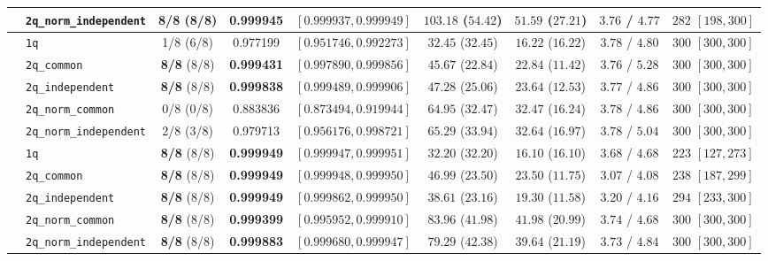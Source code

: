 \documentclass[11pt,a4paper]{article}
\begin{document}
\begin{table}[H]
{\begin{tabular}{llccccccc}
 & \texttt{2q\_norm\_independent} & \textbf{8/8} (8/8) & \textbf{0.999945} & $[0.999937, 0.999949]$ & $103.18$ ($54.42$) & $51.59$ ($27.21$) & $3.76$ / $4.77$ & $282$ $[198, 300]$ \\
\midrule
{}
 & \texttt{1q} & 1/8 (6/8) & 0.977199 & $[0.951746, 0.992273]$ & $32.45$ ($32.45$) & $16.22$ ($16.22$) & $3.78$ / $4.80$ & $300$ $[300, 300]$ \\
 & \texttt{2q\_common} & \textbf{8/8} (8/8) & \textbf{0.999431} & $[0.997890, 0.999856]$ & $45.67$ ($22.84$) & $22.84$ ($11.42$) & $3.76$ / $5.28$ & $300$ $[300, 300]$ \\
 & \texttt{2q\_independent} & \textbf{8/8} (8/8) & \textbf{0.999838} & $[0.999489, 0.999906]$ & $47.28$ ($25.06$) & $23.64$ ($12.53$) & $3.77$ / $4.86$ & $300$ $[300, 300]$ \\
 & \texttt{2q\_norm\_common} & 0/8 (0/8) & 0.883836 & $[0.873494, 0.919944]$ & $64.95$ ($32.47$) & $32.47$ ($16.24$) & $3.78$ / $4.86$ & $300$ $[300, 300]$ \\
 & \texttt{2q\_norm\_independent} & 2/8 (3/8) & 0.979713 & $[0.956176, 0.998721]$ & $65.29$ ($33.94$) & $32.64$ ($16.97$) & $3.78$ / $5.04$ & $300$ $[300, 300]$ \\
\midrule
{}
 & \texttt{1q} & \textbf{8/8} (8/8) & \textbf{0.999949} & $[0.999947, 0.999951]$ & $32.20$ ($32.20$) & $16.10$ ($16.10$) & $3.68$ / $4.68$ & $223$ $[127, 273]$ \\
 & \texttt{2q\_common} & \textbf{8/8} (8/8) & \textbf{0.999949} & $[0.999948, 0.999950]$ & $46.99$ ($23.50$) & $23.50$ ($11.75$) & $3.07$ / $4.08$ & $238$ $[187, 299]$ \\
 & \texttt{2q\_independent} & \textbf{8/8} (8/8) & \textbf{0.999949} & $[0.999862, 0.999950]$ & $38.61$ ($23.16$) & $19.30$ ($11.58$) & $3.20$ / $4.16$ & $294$ $[233, 300]$ \\
 & \texttt{2q\_norm\_common} & \textbf{8/8} (8/8) & \textbf{0.999399} & $[0.995952, 0.999910]$ & $83.96$ ($41.98$) & $41.98$ ($20.99$) & $3.74$ / $4.68$ & $300$ $[300, 300]$ \\
 & \texttt{2q\_norm\_independent} & \textbf{8/8} (8/8) & \textbf{0.999883} & $[0.999680, 0.999947]$ & $79.29$ ($42.38$) & $39.64$ ($21.19$) & $3.73$ / $4.84$ & $300$ $[300, 300]$ \\

\end{tabular}}
\end{table}
\end{document}
